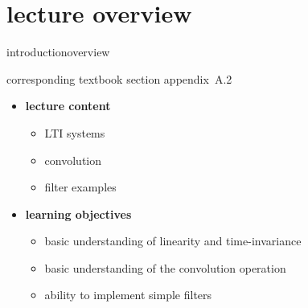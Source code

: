


\subtitle{module A.2: fundamentals~---~convolution}


	

    \section[overview]{lecture overview}
        \begin{frame}{introduction}{overview}
            \begin{block}{corresponding textbook section}
                    appendix~A.2
            \end{block}

            \begin{itemize}
                \item   \textbf{lecture content}
                    \begin{itemize}
                        \item   LTI systems
                        \item   convolution
                        \item   filter examples
                    \end{itemize}
                \bigskip
                \item<2->   \textbf{learning objectives}
                    \begin{itemize}
                        \item   basic understanding of linearity and time-invariance
                        \item   basic understanding of the convolution operation
                        \item   ability to implement simple filters
                    \end{itemize}
            \end{itemize}
        \end{frame}
        
